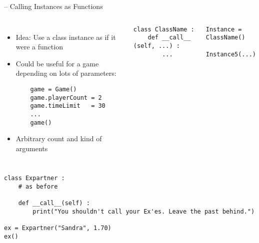 
\begin{frame}[fragile]{ -- Calling Instances as Functions}
%
\begin{columns}[T]
%
\begin{itemize}
\item Idea: Use a class instance as if it were a function
\item Could be useful for a game depending on lots of parameters:
	\begin{verbatim}
	game = Game()
	game.playerCount = 2
	game.timeLimit   = 30
	...
	game()
	\end{verbatim}
\item Arbitrary count and kind of arguments
\end{itemize}
%
\begin{codebox}
\begin{verbatim}
class ClassName :
    def __call__ (self, ...) :
        ...
\end{verbatim}
\end{codebox}
%
\begin{codebox}
\begin{verbatim}
Instance = ClassName()

Instance5(...)
\end{verbatim}
\end{codebox}
\end{columns}
%
\end{frame}


\begin{frame}[fragile]
%
\begin{codebox}
\begin{verbatim}
class Expartner :
    # as before
    
    def __call__(self) :
        print("You shouldn't call your Ex'es. Leave the past behind.")

ex = Expartner("Sandra", 1.70)
ex()
\end{verbatim}
\end{codebox}
%
\end{frame}